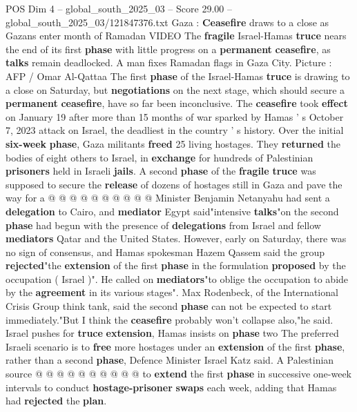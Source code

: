 \begin{textsample}{POS Dim 4 – global\_south\_2025\_03 – Score 29.00 – global\_south\_2025\_03/121847376.txt}  \label{ex:f4_pos_038}
Gaza : \textbf{Ceasefire} draws to a close as Gazans enter month of Ramadan VIDEO The \textbf{fragile} Israel-Hamas \textbf{truce} nears the end of its first \textbf{phase} with little progress on a \textbf{permanent} \textbf{ceasefire}, as \textbf{talks} remain deadlocked.
A man fixes Ramadan flags in Gaza City.
Picture : AFP / Omar Al-Qattaa The first \textbf{phase} of the Israel-Hamas \textbf{truce} is drawing to a close on Saturday, but \textbf{negotiations} on the next stage, which should secure a \textbf{permanent} \textbf{ceasefire}, have so far been inconclusive.
The \textbf{ceasefire} took \textbf{effect} on January 19 after more than 15 months of war sparked by Hamas ' s October 7, 2023 attack on Israel, the deadliest in the country ' s history.
Over the initial \textbf{six-week} \textbf{phase}, Gaza militants \textbf{freed} 25 living hostages.
They \textbf{returned} the bodies of eight others to Israel, in \textbf{exchange} for hundreds of Palestinian \textbf{prisoners} held in Israeli \textbf{jails}.
A second \textbf{phase} of the \textbf{fragile} \textbf{truce} was supposed to secure the \textbf{release} of dozens of hostages still in Gaza and pave the way for a @ @ @ @ @ @ @ @ @ @ Minister Benjamin Netanyahu had sent a \textbf{delegation} to Cairo, and \textbf{mediator} Egypt said"intensive \textbf{talks}"on the second \textbf{phase} had begun with the presence of \textbf{delegations} from Israel and fellow \textbf{mediators} Qatar and the United States.
However, early on Saturday, there was no sign of consensus, and Hamas spokesman Hazem Qassem said the group \textbf{rejected}"the \textbf{extension} of the first \textbf{phase} in the formulation \textbf{proposed} by the occupation ( Israel )".
He called on \textbf{mediators}"to oblige the occupation to abide by the \textbf{agreement} in its various stages".
Max Rodenbeck, of the International Crisis Group think tank, said the second \textbf{phase} can not be expected to start immediately."But I think the \textbf{ceasefire} probably won't collapse also,"he said.
Israel pushes for \textbf{truce} \textbf{extension}, Hamas insists on \textbf{phase} two The preferred Israeli scenario is to \textbf{free} more hostages under an \textbf{extension} of the first \textbf{phase}, rather than a second \textbf{phase}, Defence Minister Israel Katz said.
A Palestinian source @ @ @ @ @ @ @ @ @ @ to \textbf{extend} the first \textbf{phase} in successive one-week intervals to conduct \textbf{hostage-prisoner} \textbf{swaps} each week, adding that Hamas had \textbf{rejected} the \textbf{plan}.

\end{textsample}
